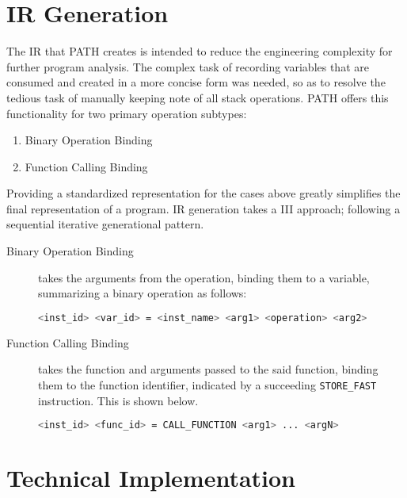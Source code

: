         \section{\acs{IR} Generation}
        \label{sec:irgen}
        \par The \acs{IR} that \acs{PATH} creates is intended to reduce the engineering complexity for further program analysis. The complex task of recording variables that are consumed and created in a more concise form
        was needed, so as to resolve the tedious task of manually keeping note of all stack operations. \acs{PATH} offers this functionality for two primary operation subtypes:
        \begin{enumerate}
            \item Binary Operation Binding
            \item Function Calling Binding
        \end{enumerate}
        Providing a standardized representation for the cases above greatly simplifies the final representation of a program. \acs{IR} generation takes a \acs{III} approach; following a sequential iterative generational pattern.
        \begin{description}
            \item[Binary Operation Binding] takes the arguments from the operation, binding them to a variable, summarizing a binary operation as follows: 
            \begin{lstlisting}[language=bash,caption=Binary Operation Binding Syntax,numbers=none]
<inst_id> <var_id> = <inst_name> <arg1> <operation> <arg2>
            \end{lstlisting}

            \item[Function Calling Binding] takes the function and arguments passed to the said function, binding them to the function identifier, indicated by a succeeding \lstinline|STORE_FAST| instruction. This is shown below.
            \begin{lstlisting}[language=bash, caption=Function Calling Binding,numbers=none]
<inst_id> <func_id> = CALL_FUNCTION <arg1> ... <argN>
            \end{lstlisting}
        \end{description}

    \pagebreak
    \section{Technical Implementation}
            
